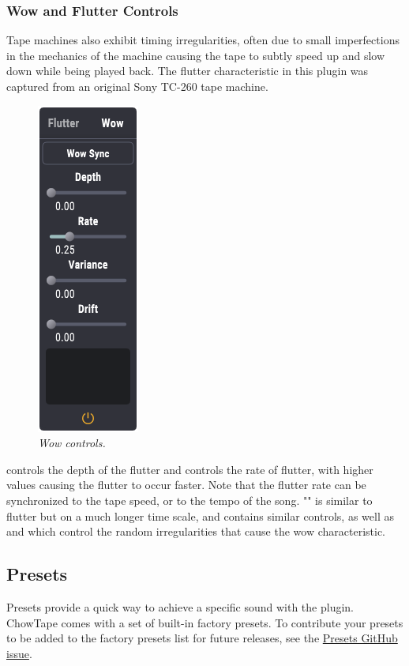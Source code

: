 \documentclass[landscape,twocolumn,a5paper]{manual}
\begin{document}
\subsubsection{Wow and Flutter Controls}
Tape machines also exhibit timing irregularities, often due
to small imperfections in the mechanics of the machine causing
the tape to subtly speed up and slow down while being
played back. The flutter characteristic in this plugin was
captured from an original Sony TC-260 tape machine.
\newpar
%
\begin{figure}[ht]
    \center
    \includegraphics[height=0.32\paperheight]{../Plugin/Screenshots/Wow.png}
    \caption{\label{h_bias}{\it Wow controls.}}
\end{figure}
%
 controls the depth of the flutter and
 controls the rate of flutter, with higher values
causing the flutter to occur faster. Note that the
flutter rate can be synchronized to the tape speed, or to the
tempo of the song.
\newpar
"" is similar to flutter but on a much longer time scale,
and contains similar controls, as well as  and
 which control the random irregularities that
cause the wow characteristic.

\subsection{Presets}
Presets provide a quick way to achieve a specific sound
with the plugin. ChowTape comes with a set of built-in
factory presets. To contribute your presets to be added
to the factory presets list for future releases, see the
\href{https://github.com/jatinchowdhury18/AnalogTapeModel/issues/30}{Presets GitHub issue}.
\end{document}
